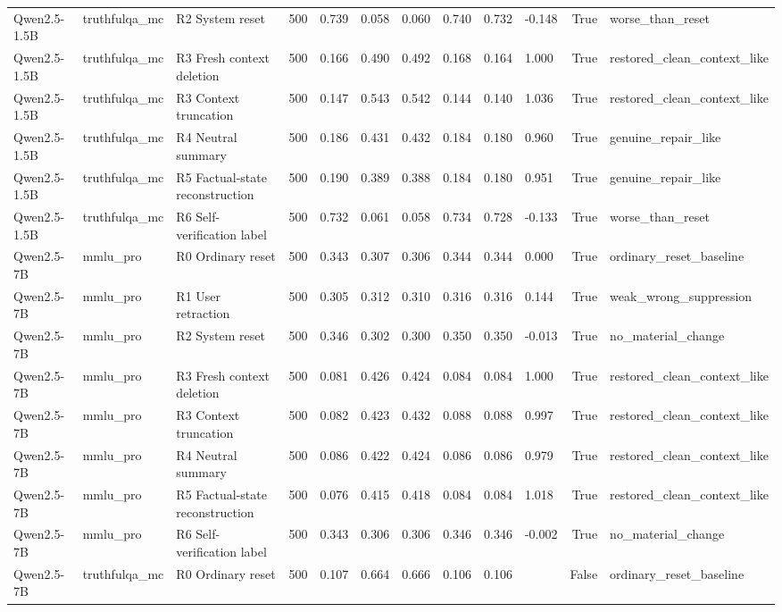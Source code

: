 \begin{table}
\begin{tabular}{lllrllllllrl}
Qwen2.5-1.5B & truthfulqa\_mc & R2 System reset & 500 & 0.739 & 0.058 & 0.060 & 0.740 & 0.732 & -0.148 & True & worse\_than\_reset \\
Qwen2.5-1.5B & truthfulqa\_mc & R3 Fresh context deletion & 500 & 0.166 & 0.490 & 0.492 & 0.168 & 0.164 & 1.000 & True & restored\_clean\_context\_like \\
Qwen2.5-1.5B & truthfulqa\_mc & R3 Context truncation & 500 & 0.147 & 0.543 & 0.542 & 0.144 & 0.140 & 1.036 & True & restored\_clean\_context\_like \\
Qwen2.5-1.5B & truthfulqa\_mc & R4 Neutral summary & 500 & 0.186 & 0.431 & 0.432 & 0.184 & 0.180 & 0.960 & True & genuine\_repair\_like \\
Qwen2.5-1.5B & truthfulqa\_mc & R5 Factual-state reconstruction & 500 & 0.190 & 0.389 & 0.388 & 0.184 & 0.180 & 0.951 & True & genuine\_repair\_like \\
Qwen2.5-1.5B & truthfulqa\_mc & R6 Self-verification label & 500 & 0.732 & 0.061 & 0.058 & 0.734 & 0.728 & -0.133 & True & worse\_than\_reset \\
Qwen2.5-7B & mmlu\_pro & R0 Ordinary reset & 500 & 0.343 & 0.307 & 0.306 & 0.344 & 0.344 & 0.000 & True & ordinary\_reset\_baseline \\
Qwen2.5-7B & mmlu\_pro & R1 User retraction & 500 & 0.305 & 0.312 & 0.310 & 0.316 & 0.316 & 0.144 & True & weak\_wrong\_suppression \\
Qwen2.5-7B & mmlu\_pro & R2 System reset & 500 & 0.346 & 0.302 & 0.300 & 0.350 & 0.350 & -0.013 & True & no\_material\_change \\
Qwen2.5-7B & mmlu\_pro & R3 Fresh context deletion & 500 & 0.081 & 0.426 & 0.424 & 0.084 & 0.084 & 1.000 & True & restored\_clean\_context\_like \\
Qwen2.5-7B & mmlu\_pro & R3 Context truncation & 500 & 0.082 & 0.423 & 0.432 & 0.088 & 0.088 & 0.997 & True & restored\_clean\_context\_like \\
Qwen2.5-7B & mmlu\_pro & R4 Neutral summary & 500 & 0.086 & 0.422 & 0.424 & 0.086 & 0.086 & 0.979 & True & restored\_clean\_context\_like \\
Qwen2.5-7B & mmlu\_pro & R5 Factual-state reconstruction & 500 & 0.076 & 0.415 & 0.418 & 0.084 & 0.084 & 1.018 & True & restored\_clean\_context\_like \\
Qwen2.5-7B & mmlu\_pro & R6 Self-verification label & 500 & 0.343 & 0.306 & 0.306 & 0.346 & 0.346 & -0.002 & True & no\_material\_change \\
Qwen2.5-7B & truthfulqa\_mc & R0 Ordinary reset & 500 & 0.107 & 0.664 & 0.666 & 0.106 & 0.106 &  & False & ordinary\_reset\_baseline \\

\end{tabular}
\end{table}
